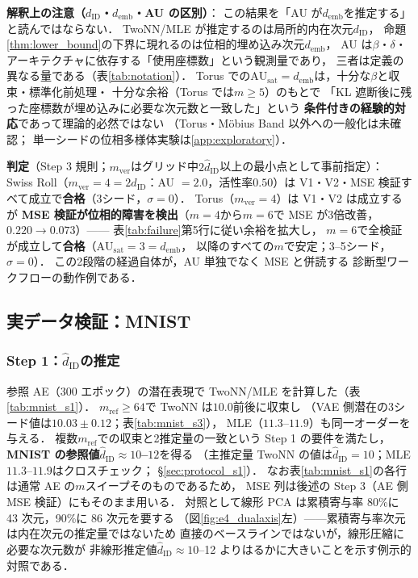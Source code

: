 \documentclass[11pt,a4paper]{jsarticle}
\newcommand{\dID}{d_{\mathrm{ID}}}
\newcommand{\hatdID}{\hat{d}_{\mathrm{ID}}}
\newcommand{\AUsat}{\mathrm{AU}_{\mathrm{sat}}}
\newcommand{\demb}{d_{\mathrm{emb}}}
\begin{document}
\textbf{解釈上の注意（$\dID$・$\demb$・AU の区別）}：
この結果を「AU が$\demb$を推定する」と読んではならない．
TwoNN/MLE が推定するのは局所的内在次元$\dID$，
命題\ref{thm:lower_bound}の下界に現れるのは位相的埋め込み次元$\demb$，
AU は$\beta$・$\delta$・アーキテクチャに依存する「使用座標数」という観測量であり，
三者は定義の異なる量である（表\ref{tab:notation}）．
Torus での$\AUsat = \demb$は，十分な$\beta$と収束・標準化前処理・
十分な余裕（Torus では$m \geq 5$）のもとで
「KL 遮断後に残った座標数が埋め込みに必要な次元数と一致した」という
\textbf{条件付きの経験的対応}であって理論的必然ではない
（Torus・M\"obius Band 以外への一般化は未確認；
単一シードの位相多様体実験は\ref{app:exploratory}）．

\textbf{判定}（Step 3 規則；$m_{\mathrm{ver}}$はグリッド中$2\hatdID$以上の最小点として事前指定）：
Swiss Roll（$m_{\mathrm{ver}} = 4 = 2\hatdID$：AU $= 2.0$，活性率$0.50$）は
V1・V2・MSE 検証すべて成立で\textbf{合格}（3シード，$\sigma = 0$）．
Torus（$m_{\mathrm{ver}} = 4$）は V1・V2 は成立するが
\textbf{MSE 検証が位相的障害を検出}（$m = 4$から$m = 6$で MSE が3倍改善，
$0.220 \to 0.073$）——
表\ref{tab:failure}第5行に従い余裕を拡大し，
$m = 6$で全検証が成立して\textbf{合格}（$\AUsat = 3 = \demb$，
以降のすべての$m$で安定；3--5シード，$\sigma = 0$）．
この2段階の経過自体が，AU 単独でなく MSE と併読する
診断型ワークフローの動作例である．

\subsection{実データ検証：MNIST}\label{sec:exp_mnist}

\subsubsection{Step 1：$\hatdID$の推定}

参照 AE（300 エポック）の潜在表現で TwoNN/MLE を計算した（表\ref{tab:mnist_s1}）．
$m_{\mathrm{ref}} \geq 64$で TwoNN は$10.0$前後に収束し
（VAE 側潜在の3シード値は$10.03 \pm 0.12$；表\ref{tab:mnist_s3}），
MLE（$11.3$--$11.9$）も同一オーダーを与える．
複数$m_{\mathrm{ref}}$での収束と2推定量の一致という Step 1 の要件を満たし，
\textbf{MNIST の参照値$\hatdID \approx 10$--$12$}を得る
（主推定量 TwoNN の値は$\hatdID = 10$；MLE $11.3$--$11.9$はクロスチェック；
§\ref{sec:protocol_s1}）．
なお表\ref{tab:mnist_s1}の各行は通常 AE の$m$スイープそのものであるため，
MSE 列は後述の Step 3（AE 側 MSE 検証）にもそのまま用いる．
対照として線形 PCA は累積寄与率 80\%に 43 次元，90\%に 86 次元を要する
（図\ref{fig:e4_dualaxis}左）——累積寄与率次元は内在次元の推定量ではないため
直接のベースラインではないが，線形圧縮に必要な次元数が
非線形推定値$\hatdID \approx 10$--12 よりはるかに大きいことを示す例示的対照である．
\end{document}
